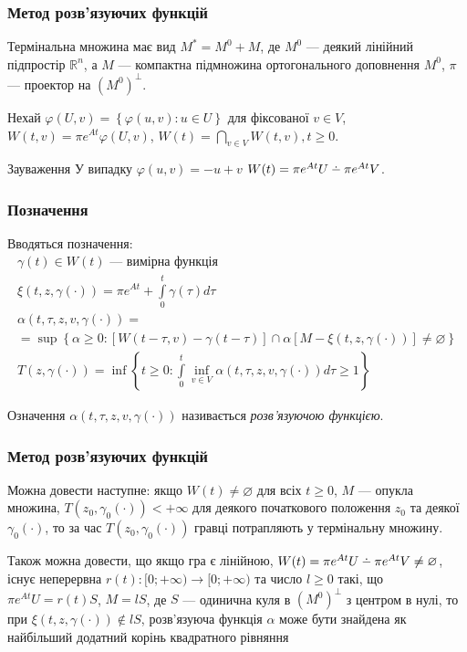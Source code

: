\documentclass[10pt,pdf]{beamer}
\newcommand{\R}{\mathbb{R}}
\newcommand{\vf}{\varphi}
\renewcommand{\l}{\left}
\renewcommand{\r}{\right}
\newcommand{\intl}{\int\limits}
\def\setdif{\mathbin{\ooalign{\hss\raise1ex\hbox{.}\hss\cr
  \mathsurround=0pt$-$}}}
\begin{document}
    \begin{frame}
        \frametitle{Метод розв’язуючих функцій}
    
        Термінальна множина має вид $M^* = M^0 + M$, де
        $M^0$ --- деякий лінійний підпростір $\R^n$, а $M$ --- компактна підмножина ортогонального доповнення $M^0$,
        $\pi$ --- проектор на $(M^0)^\perp$.

        Нехай $\vf(U, v) = \l\{\vf(u,v) : u \in U\r\}$ для фіксованої $v \in V$,
        $W(t, v) = \pi e^{At} \vf(U, v)$,
        $W(t) = \bigcap\limits_{v \in V} W(t, v), t\geq 0$. 
        \begin{block}{Зауваження}
            У випадку $\vf(u,v) = -u + v$ $W(t) = \pi e^{At}U \setdif \pi e^{At} V$.
        \end{block}
    
    \end{frame}
    \begin{frame}
        \frametitle{Позначення}
    
        Вводяться позначення:
        \begin{gather*}
            \gamma(t) \in W(t) \text{ --- вимірна функція} \\
            \xi(t, z, \gamma(\cdot)) = \pi e^{A t} + \intl_0^t \gamma(\tau) d\tau \\
            \alpha(t, \tau, z, v, \gamma(\cdot)) = \\ = \sup\l\{ 
                \alpha \geq 0 : \l[ W(t-\tau, v) - \gamma(t-\tau)\r] \cap \alpha
                \l[M - \xi(t, z, \gamma(\cdot))\r] \neq \varnothing
            \r\} \\
            T(z, \gamma(\cdot)) = \inf \l\{ 
                t\geq 0: \intl_0^t \underset{v\in V}{\inf} \alpha(t, \tau, z, v, \gamma(\cdot)) d\tau \geq 1
            \r\}
        \end{gather*}

        \begin{block}{Означення}
            $\alpha(t, \tau, z, v, \gamma(\cdot))$ називається \emph{розв'язуючою функцією}.
        \end{block}
    \end{frame}
    \begin{frame}
        \frametitle{Метод розв’язуючих функцій}
    
        Можна довести наступне: якщо $W(t) \neq \varnothing$ для всіх $t\geq 0$,
        $M$ --- опукла множина, $T(z_0, \gamma_0(\cdot)) < +\infty$ для деякого початкового положення
        $z_0$ та деякої $\gamma_0(\cdot)$, то за час $T(z_0, \gamma_0(\cdot))$ гравці потрапляють у термінальну множину.

        Також можна довести, що якщо гра є лінійною,
        $W(t) = \pi e^{At}U \setdif \pi e^{At} V \neq \varnothing$, існує неперервна 
        $r(t): [0; +\infty) \to [0; +\infty)$ та число $l \geq 0$ такі, що
        $\pi e^{A t}U = r(t) S$, $M = l S$, де $S$ --- одинична куля в $(M^0)^\perp$ з центром в нулі, то
        при $\xi(t, z, \gamma(\cdot)) \notin l S$, розв'язуюча функція $\alpha$ може бути знайдена як найбільший додатний корінь квадратного рівняння
    
    \end{frame}
\end{document}
